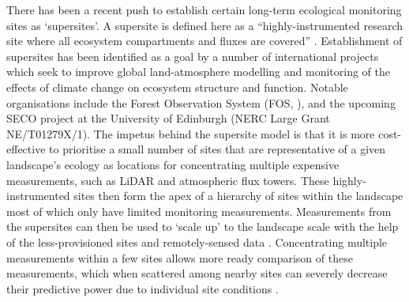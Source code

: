 \begin{refsection}
There has been a recent push to establish certain long-term ecological monitoring sites as `supersites'. A supersite is defined here as a ``highly-instrumented research site where all ecosystem compartments and fluxes are covered'' \citep{Mikkelsen2013}. Establishment of supersites has been identified as a goal by a number of international projects which seek to improve global land-atmosphere modelling and monitoring of the effects of climate change on ecosystem structure and function. Notable organisations include the Forest Observation System (FOS, \citealt{Chave2019}), and the upcoming SECO project at the University of Edinburgh (NERC Large Grant NE/T01279X/1). The impetus behind the supersite model is that it is more cost-effective to prioritise a small number of sites that are representative of a given landscape's ecology as locations for concentrating multiple expensive measurements, such as LiDAR and atmospheric flux towers. These highly-instrumented sites then form the apex of a hierarchy of sites within the landscape most of which only have limited monitoring measurements. Measurements from the supersites can then be used to `scale up' to the landscape scale with the help of the less-provisioned sites and remotely-sensed data \citep{Anderson2018}. Concentrating multiple measurements within a few sites allows more ready comparison of these measurements, which when scattered among nearby sites can severely decrease their predictive power due to individual site conditions \citep{Mikkelsen2013}.


\end{refsection}

